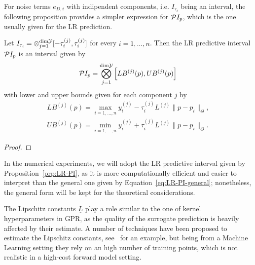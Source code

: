 For noise terms $e_{D,i}$ with indipendent components, i.e. $I_{\tau_i}$ being an interval, the following proposition provides a simpler expression for $\mathcal PI_p$, which is the one usually given for the LR prediction.
\begin{prp}\label{prp:LR-PI}
    Let $I_{\tau_i} = \otimes_{j=1}^{\text{dim}\mathcal Y} [ -\tau_i^{(j)}, \tau_i^{(j)} ]$ for every $i = 1, \dots, n$.
    Then the LR predictive interval $\mathcal PI_p$ is an interval given by
    \begin{equation}\label{eq:LR-PI}
        \mathcal PI_p = \bigotimes_{j=1}^{\text{dim}\mathcal Y} \left[ LB^{(j)}(p), UB^{(j)}(p)\right]
    \end{equation}
    with lower and upper bounds given for each component $j$ by
    \begin{equation} \label{LR-bounds}
    \begin{gathered}
        LB^{(j)}(p) = \max_{i=1,\dots,n} y_i^{(j)} - \tau_i^{(j)} L^{(j)} \| p - p_i \|_\Theta, \\
        UB^{(j)}(p) = \min_{i=1,\dots,n} y_i^{(j)} + \tau_i^{(j)} L^{(j)} \| p - p_i \|_\Theta.
    \end{gathered}
    \end{equation}
\end{prp}
\begin{proof}
\end{proof}

In the numerical experiments, we will adopt the LR predictive interval given by Proposition~\ref{prp:LR-PI}, as it is more computationally efficient and easier to interpret than the general one given by Equation~\eqref{eq:LR-PI-general}; nonetheless, the general form will be kept for the theoretical considerations. \newline

The Lipschitz constants $\underline L$ play a role similar to the one of kernel hyperparameters in GPR, as the quality of the surrogate prediction is heavily affected by their estimate.
A number of techniques have been proposed to estimate the Lipschitz constants, see~\cite{Calliess2017} for an example, but being from a Machine Learning setting they rely on an high number of training points, which is not realistic in a high-cost forward model setting.

